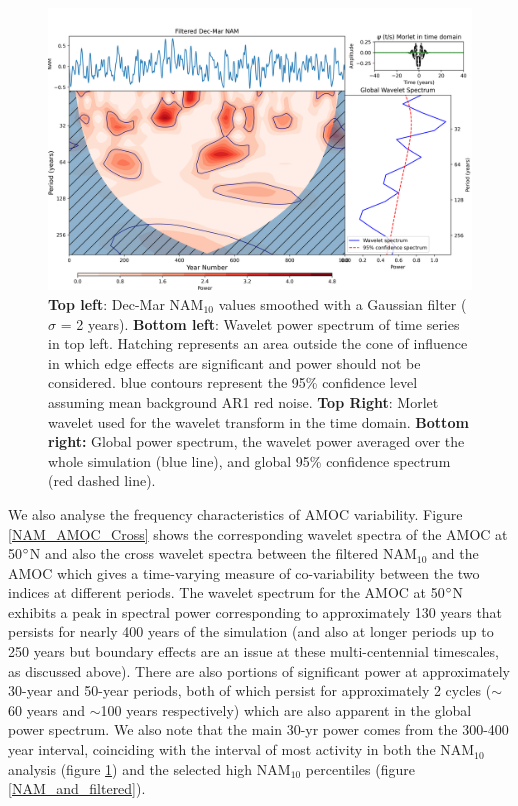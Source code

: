 \begin{figure}[h!]
\begin{center}
\noindent\includegraphics[width = 0.8\linewidth]{Figures/Figures-surface/NAM_wavelet_UKESM.png}
\caption[Wavelet power spectrum of smoothed NAM$_{10}$ index]{\textbf{Top left}: Dec-Mar NAM$_{10}$ values smoothed with a Gaussian filter ($\sigma$ = 2 years). \textbf{Bottom left}: Wavelet power spectrum of time series in top left. Hatching represents an area outside the cone of influence in which edge effects are significant and power should not be considered. blue contours represent the 95\% confidence level assuming mean background AR1 red noise. \textbf{Top Right}: Morlet wavelet used for the wavelet transform in the time domain. \textbf{Bottom right:} Global power spectrum, the wavelet power averaged over the whole simulation (blue line), and global 95\% confidence spectrum (red dashed line).}
\label{NAM_wavelet}
\end{center}
\end{figure}

We also analyse the frequency characteristics of AMOC variability. Figure \ref{NAM_AMOC_Cross} shows the corresponding wavelet spectra of the AMOC at 50$\degree$N and also the cross wavelet spectra between the filtered NAM$_{10}$ and the AMOC which gives a time-varying measure of co-variability between the two indices at different periods. The wavelet spectrum for the AMOC at 50$\degree$N exhibits a peak in spectral power corresponding to approximately 130 years that persists for nearly 400 years of the simulation (and also at longer periods up to 250 years but boundary effects are an issue at these multi-centennial timescales, as discussed above). There are also portions of significant power at approximately 30-year and 50-year periods, both of which persist for approximately 2 cycles ($\sim$60 years and $\sim$100 years respectively) which are also apparent in the global power spectrum. We also note that the main 30-yr power comes from the 300-400 year interval, coinciding with the interval of most activity in both the NAM$_{10}$ analysis (figure \ref{NAM_wavelet}) and the selected high NAM$_{10}$ percentiles (figure \ref{NAM_and_filtered}). 
 
